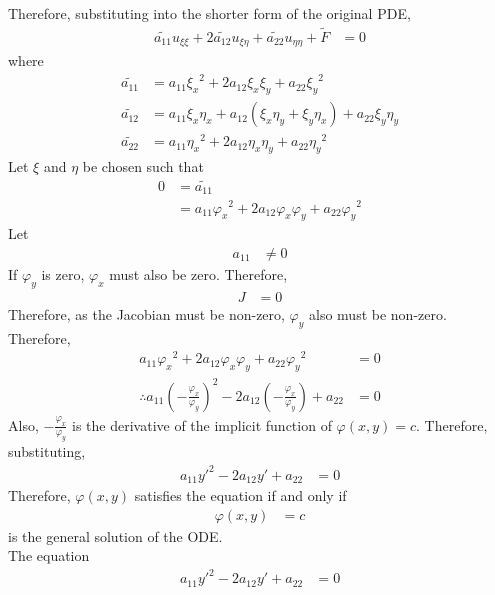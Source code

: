 \documentclass[titlepage, fleqn, a4paper, 12pt, twoside]{article}
\theoremstyle{definition}
\theoremstyle{theorem}
\renewcommand{\tilde}{\widetilde}
\begin{document}
Therefore, substituting into the shorter form of the original PDE,
\begin{align*}
	\tilde{a_{1 1}} u_{\xi \xi} + 2 \tilde{a_{1 2}} u_{\xi \eta} + \tilde{a_{2 2}} u_{\eta \eta} + \tilde{F} & = 0
\end{align*}
where
\begin{align*}
	\tilde{a_{1 1}} & = a_{1 1} {\xi_x}^2 + 2 a_{1 2} \xi_x \xi_y + a_{2 2} {\xi_y}^2                       \\
	\tilde{a_{1 2}} & = a_{1 1} \xi_x \eta_x + a_{1 2} (\xi_x \eta_y + \xi_y \eta_x) + a_{2 2} \xi_y \eta_y \\
	\tilde{a_{2 2}} & = a_{1 1} {\eta_x}^2 + 2 a_{1 2} \eta_x \eta_y + a_{2 2} {\eta_y}^2
\end{align*}
Let $\xi$ and $\eta$ be chosen such that
\begin{align*}
	0 & = \tilde{a_{1 1}} \\
          & = a_{1 1} {\varphi_x}^2 + 2 a_{1 2} \varphi_x \varphi_y + a_{2 2} {\varphi_y}^2
\end{align*}
Let
\begin{align*}
	a_{1 1} & \neq 0
\end{align*}
If $\varphi_y$ is zero, $\varphi_x$ must also be zero.
Therefore,
\begin{align*}
	J & = 0
\end{align*}
Therefore, as the Jacobian must be non-zero, $\varphi_y$ also must be non-zero.
Therefore,
\begin{align*}
	a_{1 1} {\varphi_x}^2 + 2 a_{1 2} \varphi_x \varphi_y + a_{2 2} {\varphi_y}^2                                                      & = 0 \\
	\therefore a_{1 1} \left( -\frac{\varphi_x}{\varphi_y} \right)^2 - 2 a_{1 2} \left( -\frac{\varphi_x}{\varphi_y} \right) + a_{2 2} & = 0
\end{align*}
Also, $-\frac{\varphi_x}{\varphi_y}$ is the derivative of the implicit function of $\varphi(x,y) = c$.
Therefore, substituting,
\begin{align*}
	a_{1 1} {y'}^2 - 2 a_{1 2} y' + a_{2 2} & = 0
\end{align*}
Therefore, $\varphi(x,y)$ satisfies the equation if and only if
\begin{align*}
	\varphi(x,y) & = c
\end{align*}
is the general solution of the ODE.\\
The equation
\begin{align*}
	a_{1 1} {y'}^2 - 2 a_{1 2} y' + a_{2 2} & = 0
\end{align*}
\end{document}
